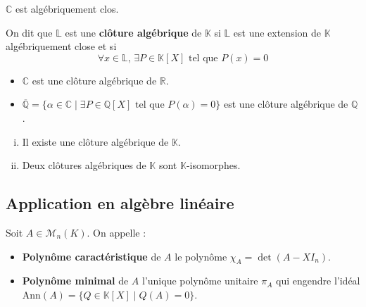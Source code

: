 	\begin{theorem}
		$\mathbb{C}$ est algébriquement clos.
	\end{theorem}

	\begin{definition}
		On dit que $\mathbb{L}$ est une \textbf{clôture algébrique} de $\mathbb{K}$ si $\mathbb{L}$ est une extension de $\mathbb{K}$ algébriquement close et si
		\[ \forall x \in \mathbb{L}, \, \exists P \in \mathbb{K}[X] \text{ tel que } P(x) = 0 \]
	\end{definition}

	\begin{example}
		\begin{itemize}
			\item $\mathbb{C}$ est une clôture algébrique de $\mathbb{R}$.
			\item $\overline{\mathbb{Q}} = \{ \alpha \in \mathbb{C} \mid \exists P \in \mathbb{Q}[X] \text{ tel que } P(\alpha) = 0 \}$ est une clôture algébrique de $\mathbb{Q}$.
		\end{itemize}
	\end{example}

	\begin{theorem}[Steinitz]
		\begin{enumerate}[(i)]
			\item Il existe une clôture algébrique de $\mathbb{K}$.
			\item Deux clôtures algébriques de $\mathbb{K}$ sont $\mathbb{K}$-isomorphes.
		\end{enumerate}
	\end{theorem}

	\subsection{Application en algèbre linéaire}


	\begin{definition}
		Soit $A \in \mathcal{M}_n(K)$. On appelle :
		\begin{itemize}
			\item \textbf{Polynôme caractéristique} de $A$ le polynôme $\chi_A = \det(A - XI_n)$.
			\item \textbf{Polynôme minimal} de $A$ l'unique polynôme unitaire $\pi_A$ qui engendre l'idéal $\mathrm{Ann}(A) = \{ Q \in \mathbb{K}[X] \mid Q(A) = 0 \}$.
		\end{itemize}
	\end{definition}

